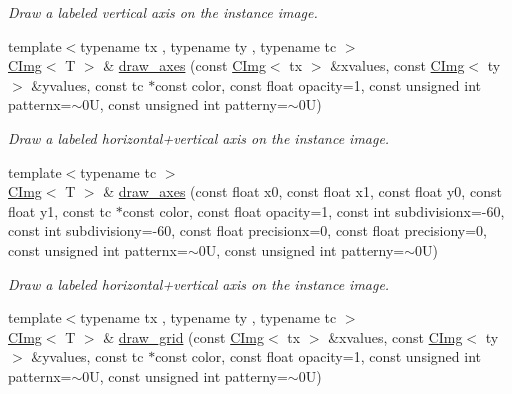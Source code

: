 \begin{DoxyCompactItemize}
\begin{DoxyCompactList}\small\item\em Draw a labeled vertical axis on the instance image. \item\end{DoxyCompactList}\item 
\hypertarget{structcimg__library_1_1CImg_a436281d3f55ad47943c7cc945076bcb3}{
{\footnotesize template$<$typename tx , typename ty , typename tc $>$ }\\\hyperlink{structcimg__library_1_1CImg}{CImg}$<$ T $>$ \& \hyperlink{structcimg__library_1_1CImg_a436281d3f55ad47943c7cc945076bcb3}{draw\_\-axes} (const \hyperlink{structcimg__library_1_1CImg}{CImg}$<$ tx $>$ \&xvalues, const \hyperlink{structcimg__library_1_1CImg}{CImg}$<$ ty $>$ \&yvalues, const tc $\ast$const color, const float opacity=1, const unsigned int patternx=$\sim$0U, const unsigned int patterny=$\sim$0U)}
\label{structcimg__library_1_1CImg_a436281d3f55ad47943c7cc945076bcb3}

\begin{DoxyCompactList}\small\item\em Draw a labeled horizontal+vertical axis on the instance image. \item\end{DoxyCompactList}\item 
\hypertarget{structcimg__library_1_1CImg_a9b257e36f964adca3f6283bb6447d593}{
{\footnotesize template$<$typename tc $>$ }\\\hyperlink{structcimg__library_1_1CImg}{CImg}$<$ T $>$ \& \hyperlink{structcimg__library_1_1CImg_a9b257e36f964adca3f6283bb6447d593}{draw\_\-axes} (const float x0, const float x1, const float y0, const float y1, const tc $\ast$const color, const float opacity=1, const int subdivisionx=-\/60, const int subdivisiony=-\/60, const float precisionx=0, const float precisiony=0, const unsigned int patternx=$\sim$0U, const unsigned int patterny=$\sim$0U)}
\label{structcimg__library_1_1CImg_a9b257e36f964adca3f6283bb6447d593}

\begin{DoxyCompactList}\small\item\em Draw a labeled horizontal+vertical axis on the instance image. \item\end{DoxyCompactList}\item 
\hypertarget{structcimg__library_1_1CImg_a6877e63794ccd3e9f8c27cd297ce7521}{
{\footnotesize template$<$typename tx , typename ty , typename tc $>$ }\\\hyperlink{structcimg__library_1_1CImg}{CImg}$<$ T $>$ \& \hyperlink{structcimg__library_1_1CImg_a6877e63794ccd3e9f8c27cd297ce7521}{draw\_\-grid} (const \hyperlink{structcimg__library_1_1CImg}{CImg}$<$ tx $>$ \&xvalues, const \hyperlink{structcimg__library_1_1CImg}{CImg}$<$ ty $>$ \&yvalues, const tc $\ast$const color, const float opacity=1, const unsigned int patternx=$\sim$0U, const unsigned int patterny=$\sim$0U)}
\label{structcimg__library_1_1CImg_a6877e63794ccd3e9f8c27cd297ce7521}


\end{DoxyCompactItemize}
